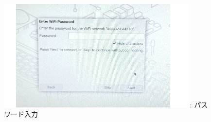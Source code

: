\documentclass[a4paper,12pt]{jarticle}
\begin{document}
\begin{enumerate}
\begin{itemize}
                      \begin{figure}[h]
                        \centering
                        \begin{minipage}{5.228cm}
                          {\upshape
                            \includegraphics[width=10.000cm]{pswd_image_0404.png}
                            \newline
                            {\theFigure\label{seq:refFigure17}}:
                            パスワード入力}
                        \end{minipage}
                      \end{figure}
                      

\end{itemize}
\end{enumerate}
\end{document}
